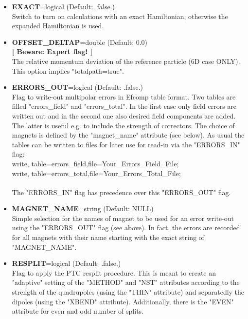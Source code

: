 \begin{itemize}
   \item {\bf EXACT}=logical (Default: .false.) \\ 
     Switch to turn on calculations with an exact Hamiltonian,
     otherwise the expanded Hamiltonian is used. 

   \item {\bf OFFSET\_DELTAP}=double (Default: 0.0) \\ 
     {\bf [ Beware: Expert flag! ]}\\
     The relative momentum deviation of the reference particle (6D case
     ONLY). This option implies "totalpath=true". 

   \item {\bf ERRORS\_OUT}=logical (Default: .false.) \\
     Flag to write-out multipolar errors in Efcomp table format. Two
     tables are filled "errors\_field" and "errors\_total". In the first
     case only field errors are written out and in the second one also
     desired field components are added. The latter is useful e.g. to
     include the strength of correctors. The choice of magnets is
     defined by the "magnet\_name" attribute (see below). As usual the
     tables can be written to files for later use for read-in via the
     "ERRORS\_IN" flag: \\ 
     write, table=errors\_field,file=Your\_Errors\_Field\_File;\\
     write, table=errors\_total,file=Your\_Errors\_Total\_File;\\
     \\
     The "ERRORS\_IN" flag has precedence over this "ERRORS\_OUT" flag.   

   \item {\bf MAGNET\_NAME}=string (Default: NULL) \\ 
     Simple selection for the names of magnet to be used for an error
     write-out using the "ERRORS\_OUT" flag (see above). In fact, the
     errors are recorded for all magnets with their name starting with
     the exact string of "MAGNET\_NAME".

   \item {\bf RESPLIT}=logical (Default: .false.) \\ 
     Flag to apply the PTC resplit procedure. This is meant to create an
     "adaptive" setting of the "METHOD" and "NST" attributes according
     to the strength of the quadrupoles (using the "THIN"  attribute)
     and separatedly the dipoles (using the "XBEND"
     attribute). Additionally, there is the  "EVEN" attribute for even
     and odd number of splits. 


\end{itemize}
